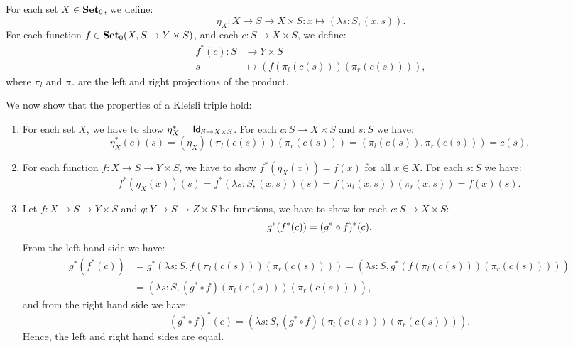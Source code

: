 \begin{solution}
	\label{sol:kleisli_triple_side_effects}
	For each set $X\in\Ob \SET$, we define:
	\[
	\eta_X : X \to S \to X \times S : x\mapsto (\lambda s: S, (x,s)).
	\]
	For each function $f\in\CHom{\Ob \SET}{X}{S \to Y \times S}$, and each $c : S \to X \times S$, we define:
	\begin{align*}
	f^{*} (c) : S & \to Y \times S  \\
	s & \mapsto (f (\pi_l(c(s))) (\pi_r (c(s)))),
	\end{align*}
	where $\pi_l$ and $\pi_r$ are the left and right projections of the product. 
	
	We now show that the properties of a Kleisli triple hold:
	\begin{enumerate}
	\item For each set $X$, we have to show $\eta_X^{*} = \Id[S \to X \times S]$. For each $c : S \to X \times S$ and $s : S$ we have:
	\[\eta^*_X (c) (s)= (\eta_X) (\pi_l (c(s))) (\pi_r (c(s))) = (\pi_l (c(s)), \pi_r (c(s))) = c (s).\]
	
	\item For each function $f:X\to S \to Y \times S$, we have to show $f^{*}(\eta_X(x)) = f(x)$ for all $x \in X$. For each $s : S$ we have: 
	\[ f^* (\eta_X (x)) (s) = f^* (\lambda s: S, (x,s)) (s) = f (\pi_l (x,s)) (\pi_r (x,s)) = f (x)(s). \]
	
	\item Let $f:X\to S \to Y \times S$ and $g:Y\to S \to Z \times S$ be functions, we have to show for each $c : S \to X \times S$:
	\[
	g^{*}(f^{*}(c)) = (\co{f}{g^{*}})^{*}(c).
	\] 
	From the left hand side we have: 
	\begin{align*}
	g^* (f^* (c)) & = g^* (\lambda s : S, f (\pi_l (c(s))) (\pi_r (c(s)))) = (\lambda s : S, g^* (f (\pi_l (c(s))) (\pi_r (c(s))))) \\
	& = (\lambda s : S, (g^* \circ f) (\pi_l (c(s))) (\pi_r (c(s)))),
	\end{align*}
	and from the right hand side we have:
	\[ (g^* \circ f)^* (c) = (\lambda s : S, (g^* \circ f) (\pi_l (c(s))) (\pi_r (c(s)))).\]
	Hence, the left and right hand sides are equal. 
	\end{enumerate}
	\end{solution}
	

